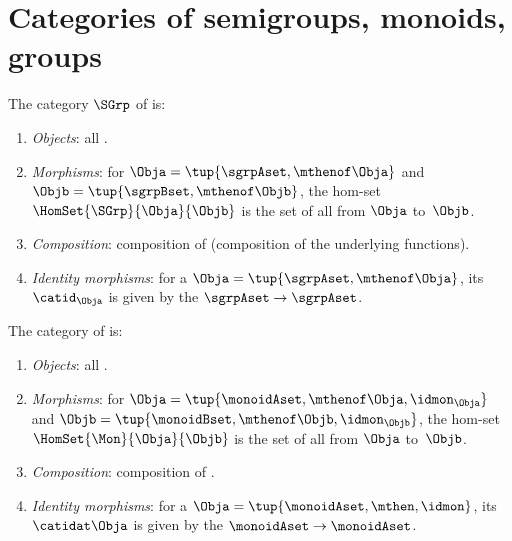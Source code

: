 
\section[Categories of semigroups, monoids, groups]{Categories of semigroups, monoids, groups}
\label{sec:cats-of-semigroups-monoids-groups}


\begin{ctdefinition}
    \label{def:SGrp}
    The category $\SGrp$ of  is:
    \begin{enumerate}
        \item \emph{Objects}: all .
        \item \emph{Morphisms}: for  $\Obja = \tup{\sgrpAset, \mthenof \Obja}$ and $\Objb = \tup{\sgrpBset, \mthenof \Objb}$,  the hom-set $\HomSet{\SGrp}{\Obja}{\Objb}$ is the set of all  from $\Obja$ to~$\Objb$.
        \item \emph{Composition}: composition of  (composition of the underlying functions).
        \item \emph{Identity morphisms}: for a  $\Obja = \tup{\sgrpAset, \mthenof \Obja}$, its  $\catid_\Obja$ is given by the  $\sgrpAset \to \sgrpAset$.
    \end{enumerate}
\end{ctdefinition}

\begin{ctdefinition}
    \label{def:Mon}
    The category \Mon of  is:
    \begin{enumerate}
        \item \emph{Objects}: all .
        \item \emph{Morphisms}: for  $\Obja = \tup{\monoidAset, \mthenof \Obja, \idmon_\Obja}$ and $\Objb = \tup{\monoidBset, \mthenof \Objb, \idmon_\Objb}$, the hom-set $\HomSet{\Mon}{\Obja}{\Objb}$ is the set of all  from $\Obja$ to~$\Objb$.
        \item \emph{Composition}: composition of .
        \item \emph{Identity morphisms}: for a  $\Obja = \tup{\monoidAset, \mthen, \idmon}$, its  $\catidat\Obja$ is given by the  $\monoidAset \to \monoidAset$.
    \end{enumerate}
\end{ctdefinition}

